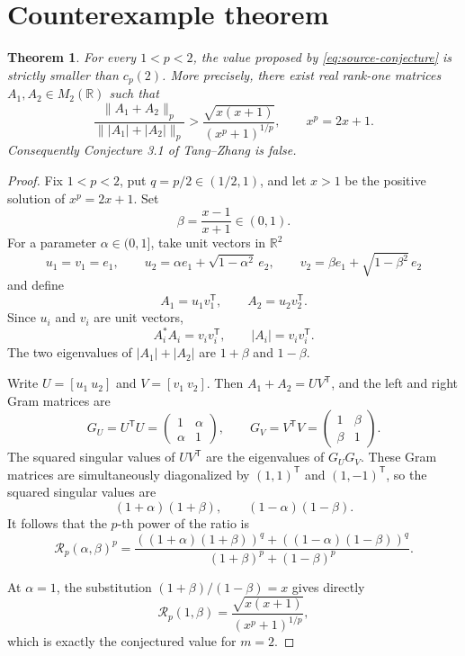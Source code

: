 \documentclass[11pt]{article}
\newtheorem{theorem}{Theorem}
\newcommand{\R}{\mathbb{R}}
\begin{document}
\section{Counterexample theorem}

\begin{theorem}\label{thm:main}
For every $1<p<2$, the value proposed by \eqref{eq:source-conjecture} is
strictly smaller than $c_p(2)$.  More precisely, there exist real rank-one
matrices $A_1,A_2\in M_2(\R)$ such that
\[
 \frac{\|A_1+A_2\|_p}{\||A_1|+|A_2|\|_p}
 > \frac{\sqrt{x(x+1)}}{(x^p+1)^{1/p}},
 \qquad x^p=2x+1.
\]
Consequently Conjecture 3.1 of Tang--Zhang is false.
\end{theorem}

\begin{proof}
Fix $1<p<2$, put $q=p/2\in(1/2,1)$, and let $x>1$ be the positive solution
of $x^p=2x+1$.  Set
\[
 \beta=\frac{x-1}{x+1}\in(0,1).
\]
For a parameter $\alpha\in(0,1]$, take unit vectors in $\R^2$
\[
 u_1=v_1=e_1,\qquad
 u_2=\alpha e_1+\sqrt{1-\alpha^2}\,e_2,\qquad
 v_2=\beta e_1+\sqrt{1-\beta^2}\,e_2
\]
and define
\[
 A_1=u_1v_1^{\mathsf T},\qquad A_2=u_2v_2^{\mathsf T}.
\]
Since $u_i$ and $v_i$ are unit vectors,
\[
 A_i^*A_i=v_iv_i^{\mathsf T},\qquad |A_i|=v_iv_i^{\mathsf T}.
\]
The two eigenvalues of $|A_1|+|A_2|$ are $1+\beta$ and $1-\beta$.

Write $U=[u_1\ u_2]$ and $V=[v_1\ v_2]$.  Then
$A_1+A_2=UV^{\mathsf T}$, and the left and right Gram matrices are
\[
 G_U=U^{\mathsf T}U=
 \begin{pmatrix}1&\alpha\\ \alpha&1\end{pmatrix},\qquad
 G_V=V^{\mathsf T}V=
 \begin{pmatrix}1&\beta\\ \beta&1\end{pmatrix}.
\]
The squared singular values of $UV^{\mathsf T}$ are the eigenvalues of
$G_UG_V$.  These Gram matrices are simultaneously diagonalized by
$(1,1)^{\mathsf T}$ and $(1,-1)^{\mathsf T}$, so the squared singular values
are
\[
 (1+\alpha)(1+\beta),\qquad (1-\alpha)(1-\beta).
\]
It follows that the $p$-th power of the ratio is
\begin{equation}\label{eq:ratio}
 \mathcal R_p(\alpha,\beta)^p=
 \frac{((1+\alpha)(1+\beta))^q+
       ((1-\alpha)(1-\beta))^q}
 {(1+\beta)^p+(1-\beta)^p}.
\end{equation}

At $\alpha=1$, the substitution $(1+\beta)/(1-\beta)=x$ gives directly
\[
 \mathcal R_p(1,\beta)
 =\frac{\sqrt{x(x+1)}}{(x^p+1)^{1/p}},
\]
which is exactly the conjectured value for $m=2$.


\end{proof}
\end{document}
